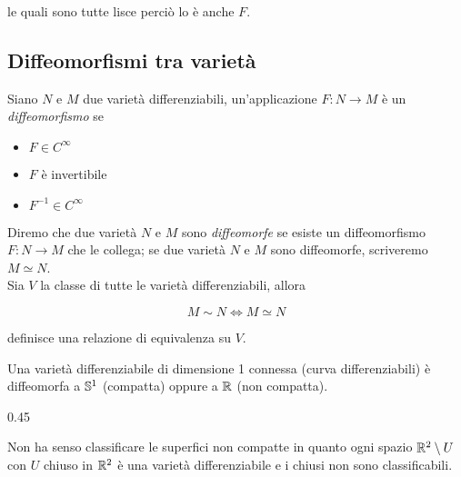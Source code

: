 le quali sono tutte lisce perciò lo è anche $ F $.

\subsection{Diffeomorfismi tra varietà}

Siano $ N $ e $ M $ due varietà differenziabili, un'applicazione $ F : N \to M $ è un \textit{diffeomorfismo} se

\begin{itemize}
	\item $ F \in C^{\infty} $
	
	\item $ F $ è invertibile
	
	\item $ F^{-1} \in C^{\infty} $
\end{itemize}

Diremo che due varietà $ N $ e $ M $ sono \textit{diffeomorfe} se esiste un diffeomorfismo $ F : N \to M $ che le collega; se due varietà $ N $ e $ M $ sono diffeomorfe, scriveremo $ M \simeq N $.\\
Sia $ V $ la classe di tutte le varietà differenziabili, allora

\begin{equation}
	M \sim N \iff M \simeq N
\end{equation}

definisce una relazione di equivalenza su $ V $.

\begin{theorem}
	Una varietà differenziabile di dimensione 1 connessa (curva differenziabili) è diffeomorfa a $ \S^{1} $ (compatta) oppure a $ \R $ (non compatta).
\end{theorem}

{0.45}{
}

\begin{remark}
	Non ha senso classificare le superfici non compatte in quanto ogni spazio $ \R^{2} \setminus U $ con $ U $ chiuso in $ \R^{2} $ è una varietà differenziabile e i chiusi non sono classificabili.
\end{remark}

